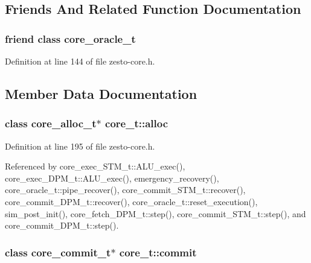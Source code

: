 \subsection{Friends And Related Function Documentation}
\subsubsection[{core\_\-oracle\_\-t}]{\setlength{\rightskip}{0pt plus 5cm}friend class {\bf core\_\-oracle\_\-t}\hspace{0.3cm}{\tt  [friend]}}\label{classcore__t_28fd9847ad7d473828154837f3829666}




Definition at line 144 of file zesto-core.h.

\subsection{Member Data Documentation}
\subsubsection[{alloc}]{\setlength{\rightskip}{0pt plus 5cm}class {\bf core\_\-alloc\_\-t}$\ast$ {\bf core\_\-t::alloc}}\label{classcore__t_20394b8c7a44d5ad56a16e9cd635299e}




Definition at line 195 of file zesto-core.h.

Referenced by core\_\-exec\_\-STM\_\-t::ALU\_\-exec(), core\_\-exec\_\-DPM\_\-t::ALU\_\-exec(), emergency\_\-recovery(), core\_\-oracle\_\-t::pipe\_\-recover(), core\_\-commit\_\-STM\_\-t::recover(), core\_\-commit\_\-DPM\_\-t::recover(), core\_\-oracle\_\-t::reset\_\-execution(), sim\_\-post\_\-init(), core\_\-fetch\_\-DPM\_\-t::step(), core\_\-commit\_\-STM\_\-t::step(), and core\_\-commit\_\-DPM\_\-t::step().
\subsubsection[{commit}]{\setlength{\rightskip}{0pt plus 5cm}class {\bf core\_\-commit\_\-t}$\ast$ {\bf core\_\-t::commit}}\label{classcore__t_1058815318dc1da3c60b90d9a5479092}




